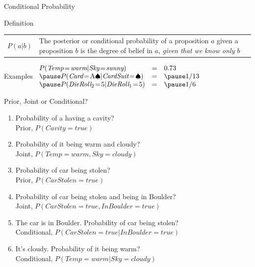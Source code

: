 \documentclass[14pt]{beamer}
\begin{document}
\begin{frame}{Conditional Probability}
	\begin{block}{Definition}
		\begin{tabular}{lm{3.4in}@{}}
			\large $P(a|b)$
			&
			The \alert{posterior} or \alert{conditional probability} of a proposition $a$ given a proposition $b$ is the degree of belief in $a$, \emph{given that we know only $b$}
		\end{tabular}
	\end{block}
	\pause
	\begin{block}{Examples}
		$
		\begin{array}{lll}
			P(\textit{Temp} \!=\! \textit{warm}|\textit{Sky} \!=\! \textit{sunny})
			 & = & 0.73 \\
			\pause
			P(\textit{Card} \!=\! \mbox{A}\spadesuit|\textit{CardSuit} \!=\! \spadesuit)
			 & = & \pause 1/13 \\
			\pause
			P(\textit{DieRoll}_2 \!=\! 5|\textit{DieRoll}_1 \!=\! 5)
			 & = & \pause 1/6 \\
		\end{array}
		$
	\end{block}
\end{frame}
\begin{frame}{Prior, Joint or Conditional?}
	\begin{enumerate}
		\item Probability of a having a cavity? \\
			\pause \tab Prior, $P(\textit{Cavity}\!=\!\textit{true})$
		\pause
		\item Probability of it being warm and cloudy? \\
			\pause \tab Joint, $P(\textit{Temp}\!=\!\textit{warm}, \textit{Sky}\!=\!\textit{cloudy})$
		\pause
		\item Probability of car being stolen? \\
			\pause \tab Prior, $P(\textit{CarStolen}\!=\!\textit{true})$
		\pause
		\item Probability of car being stolen and being in Boulder? \\
			\pause \tab Joint, $P(\textit{CarStolen}\!=\!\textit{true}, \textit{InBoulder}\!=\!\textit{true})$
		\pause
		\item The car is in Boulder. Probability of car being stolen? \\
			\pause \tab Conditional, $P(\textit{CarStolen}\!=\!\textit{true}|\textit{InBoulder}\!=\!\textit{true})$
		\pause
		\item It's cloudy. Probability of it being warm? \\
			\pause \tab Conditional, $P(\textit{Temp}\!=\!\textit{warm}| \textit{Sky}\!=\!\textit{cloudy})$
	\end{enumerate}
\end{frame}
\end{document}
